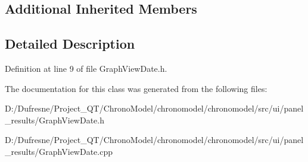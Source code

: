 \subsection*{Additional Inherited Members}


\subsection{Detailed Description}


Definition at line 9 of file Graph\-View\-Date.\-h.



The documentation for this class was generated from the following files\-:\begin{DoxyCompactItemize}
\item 
D\-:/\-Dufresne/\-Project\-\_\-\-Q\-T/\-Chrono\-Model/chronomodel/chronomodel/src/ui/panel\-\_\-results/Graph\-View\-Date.\-h\item 
D\-:/\-Dufresne/\-Project\-\_\-\-Q\-T/\-Chrono\-Model/chronomodel/chronomodel/src/ui/panel\-\_\-results/Graph\-View\-Date.\-cpp\end{DoxyCompactItemize}

